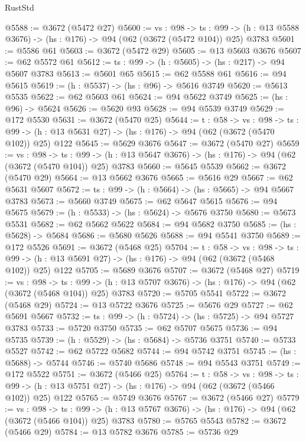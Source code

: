\begin{lexlean}{RustStd}
\begin{coremodule}
@5588 := @3672 (@5472 @27)
@5600 := {vs : @98} ->
  {ts : @99} -> (h : @13 @5588 @3676) -> (hs : @176) -> @94 (@62 (@3672 (@5472 @104)) @25) @3783
@5601 := @5586 @61
@5603 := @3672 (@5472 @29)
@5605 := @13 @5603 @3676
@5607 := @62 @5572 @61
@5612 := {ts : @99} -> (h : @5605) -> (hs : @217) -> @94 @5607 @3783
@5613 := @5601 @65
@5615 := @62 @5588 @61
@5616 := @94 @5615
@5619 := (h : @5537) -> (hs : @96) -> @5616 @3749
@5620 := @5613 @5535
@5622 := @62 @5603 @61
@5624 := @94 @5622 @3749
@5625 := (hs : @96) -> @5624
@5626 := @5620 @93
@5628 := @94 @5539 @3749
@5629 := @172 @5530
@5631 := @3672 (@5470 @25)
@5644 := {t : @58} ->
  {vs : @98} ->
  {ts : @99} -> (h : @13 @5631 @27) -> (hs : @176) -> @94 (@62 (@3672 (@5470 @102)) @25) @122
@5645 := @5629 @3676
@5647 := @3672 (@5470 @27)
@5659 := {vs : @98} ->
  {ts : @99} -> (h : @13 @5647 @3676) -> (hs : @176) -> @94 (@62 (@3672 (@5470 @104)) @25) @3783
@5660 := @5645 @5539
@5662 := @3672 (@5470 @29)
@5664 := @13 @5662 @3676
@5665 := @5616 @29
@5667 := @62 @5631 @5607
@5672 := {ts : @99} -> (h : @5664) -> (hs : @5665) -> @94 @5667 @3783
@5673 := @5660 @3749
@5675 := @62 @5647 @5615
@5676 := @94 @5675
@5679 := (h : @5533) -> (hs : @5624) -> @5676 @3750
@5680 := @5673 @5531
@5682 := @62 @5662 @5622
@5684 := @94 @5682 @3750
@5685 := (hs : @5628) -> @5684
@5686 := @5680 @5626
@5688 := @94 @5541 @3750
@5689 := @172 @5526
@5691 := @3672 (@5468 @25)
@5704 := {t : @58} ->
  {vs : @98} ->
  {ts : @99} -> (h : @13 @5691 @27) -> (hs : @176) -> @94 (@62 (@3672 (@5468 @102)) @25) @122
@5705 := @5689 @3676
@5707 := @3672 (@5468 @27)
@5719 := {vs : @98} ->
  {ts : @99} -> (h : @13 @5707 @3676) -> (hs : @176) -> @94 (@62 (@3672 (@5468 @104)) @25) @3783
@5720 := @5705 @5541
@5722 := @3672 (@5468 @29)
@5724 := @13 @5722 @3676
@5725 := @5676 @29
@5727 := @62 @5691 @5667
@5732 := {ts : @99} -> (h : @5724) -> (hs : @5725) -> @94 @5727 @3783
@5733 := @5720 @3750
@5735 := @62 @5707 @5675
@5736 := @94 @5735
@5739 := (h : @5529) -> (hs : @5684) -> @5736 @3751
@5740 := @5733 @5527
@5742 := @62 @5722 @5682
@5744 := @94 @5742 @3751
@5745 := (hs : @5688) -> @5744
@5746 := @5740 @5686
@5748 := @94 @5543 @3751
@5749 := @172 @5522
@5751 := @3672 (@5466 @25)
@5764 := {t : @58} ->
  {vs : @98} ->
  {ts : @99} -> (h : @13 @5751 @27) -> (hs : @176) -> @94 (@62 (@3672 (@5466 @102)) @25) @122
@5765 := @5749 @3676
@5767 := @3672 (@5466 @27)
@5779 := {vs : @98} ->
  {ts : @99} -> (h : @13 @5767 @3676) -> (hs : @176) -> @94 (@62 (@3672 (@5466 @104)) @25) @3783
@5780 := @5765 @5543
@5782 := @3672 (@5466 @29)
@5784 := @13 @5782 @3676
@5785 := @5736 @29

\end{coremodule}
\end{lexlean}
